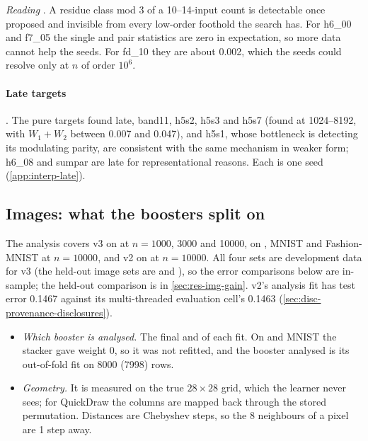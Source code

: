 \emph{Reading} . A residue class mod 3 of a 10--14-input count is detectable once proposed and invisible from every low-order foothold the search has. For h6\_00 and f7\_05 the single and pair statistics are zero in expectation, so more data cannot help the seeds. For fd\_10 they are about 0.002, which the seeds could resolve only at $n$ of order $10^6$.

\paragraph{Late targets} . The pure targets found late, band11, h5s2, h5s3 and h5s7 (found at 1024--8192, with $W_1+W_2$ between 0.007 and 0.047), and h5s1, whose bottleneck is detecting its modulating parity, are consistent with the same mechanism in weaker form; h6\_08 and sumpar are late for representational reasons. Each is one seed (\cref{app:interp-late}).

\subsection{Images: what the boosters split on}\label{sec:interp-img}

The analysis covers v3 on  at $n=1000$, 3000 and 10000, on , MNIST and Fashion-MNIST at $n=10000$, and v2 on  at $n=10000$. All four sets are development data for v3 (the held-out image sets are  and ), so the error comparisons below are in-sample; the held-out comparison is in \cref{sec:res-img-gain}. v2's analysis fit has test error 0.1467 against its multi-threaded evaluation cell's 0.1463 (\cref{sec:disc-provenance-disclosures}).
\begin{itemize}
\item \emph{Which booster is analysed.} The final  and  of each fit. On  and MNIST the stacker gave  weight 0, so it was not refitted, and the booster analysed is its out-of-fold fit on 8000 (7998) rows.
\item \emph{Geometry.} It is measured on the true $28\times28$ grid, which the learner never sees; for QuickDraw the columns are mapped back through the stored permutation. Distances are Chebyshev steps, so the 8 neighbours of a pixel are 1 step away.
\end{itemize}

